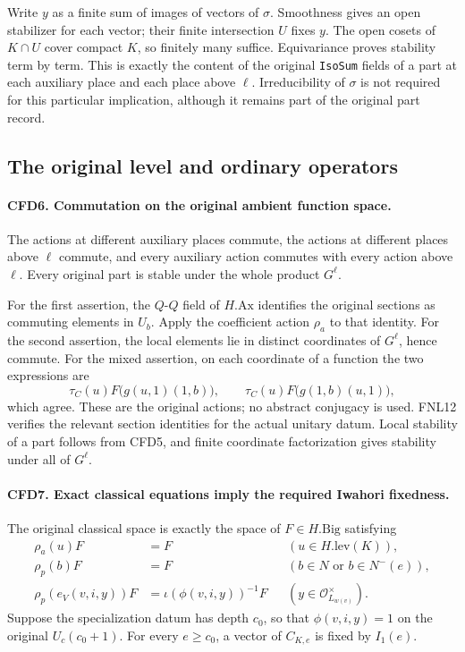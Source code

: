 Write \(y\) as a finite sum of images of vectors of \(\sigma\).
Smoothness gives an open stabilizer for each vector; their finite
intersection \(U\) fixes \(y\).  The open cosets of \(K\cap U\)
cover compact \(K\), so finitely many suffice.  Equivariance proves
stability term by term.  This is exactly the content of the original
\texttt{IsoSum} fields of a part at each auxiliary place and each place
above \(\ell\).  Irreducibility of \(\sigma\) is not required for
this particular implication, although it remains part of the original
part record.

\subsection{The original level and ordinary operators}

\paragraph{CFD6. Commutation on the original ambient function space.}
\label{claim:CFD6}
The actions at different auxiliary places commute, the actions at
different places above \(\ell\) commute, and every auxiliary action
commutes with every action above \(\ell\).  Every original part is
stable under the whole product \(G^\ell\).

For the first assertion, the \(Q\)-\(Q\) field of \(H.\mathrm{Ax}\)
identifies the original sections as commuting elements in \(U_b\).
Apply the coefficient action \(\rho_a\) to that identity.  For the
second assertion, the local elements lie in distinct coordinates of
\(G^\ell\), hence commute.  For the mixed assertion, on each coordinate
of a function the two expressions are
\[
  \tau_C(u)F\bigl(g(u,1)(1,b)\bigr),\qquad
  \tau_C(u)F\bigl(g(1,b)(u,1)\bigr),
\]
which agree.  These are the original actions; no abstract conjugacy is
used.  FNL12 verifies the relevant section identities for the actual
unitary datum.  Local stability of a part follows from CFD5, and finite
coordinate factorization gives stability under all of \(G^\ell\).

\paragraph{CFD7. Exact classical equations imply the required Iwahori fixedness.}
\label{claim:CFD7}
The original classical space is exactly the space of \(F\in H.\mathrm{Big}\)
satisfying
\begin{align*}
 \rho_a(u)F&=F &&(u\in H.\mathrm{lev}(K)),\\
 \rho_p(b)F&=F &&(b\in N\text{ or }b\in N^-(e)),\\
 \rho_p(e_V(v,i,y))F&=\iota(\phi(v,i,y))^{-1}F
                  &&(y\in\mathcal O_{L_{w(v)}}^\times).
\end{align*}
Suppose the specialization datum has depth \(c_0\), so that
\(\phi(v,i,y)=1\) on the original \(U_c(c_0+1)\).  For every
\(e\ge c_0\), a vector of \(C_{K,e}\) is fixed by \(I_1(e)\).


